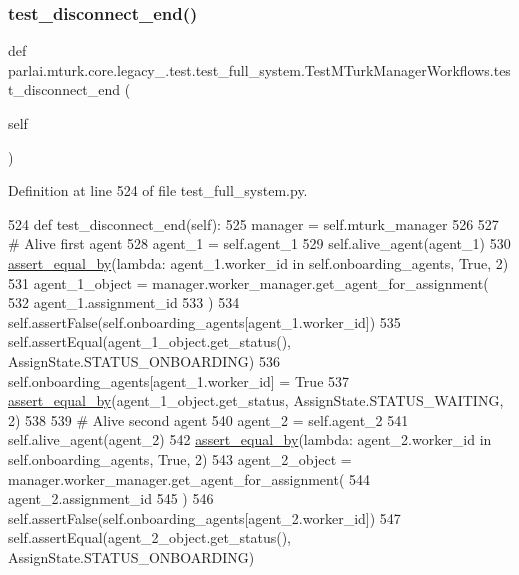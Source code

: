 \subsubsection{\texorpdfstring{test\+\_\+disconnect\+\_\+end()}{test\_disconnect\_end()}}
{\footnotesize\ttfamily def parlai.\+mturk.\+core.\+legacy\+\_.\+test.\+test\+\_\+full\+\_\+system.\+Test\+M\+Turk\+Manager\+Workflows.\+test\+\_\+disconnect\+\_\+end (\begin{DoxyParamCaption}\item[{}]{self }\end{DoxyParamCaption})}



Definition at line 524 of file test\+\_\+full\+\_\+system.\+py.


\begin{DoxyCode}
524     \textcolor{keyword}{def }test\_disconnect\_end(self):
525         manager = self.mturk\_manager
526 
527         \textcolor{comment}{# Alive first agent}
528         agent\_1 = self.agent\_1
529         self.alive\_agent(agent\_1)
530         \hyperlink{namespaceparlai_1_1mturk_1_1core_1_1test_1_1test__full__system_a0b463246d35658a2e422010f13dcf819}{assert\_equal\_by}(\textcolor{keyword}{lambda}: agent\_1.worker\_id \textcolor{keywordflow}{in} self.onboarding\_agents, \textcolor{keyword}{True}, 2)
531         agent\_1\_object = manager.worker\_manager.get\_agent\_for\_assignment(
532             agent\_1.assignment\_id
533         )
534         self.assertFalse(self.onboarding\_agents[agent\_1.worker\_id])
535         self.assertEqual(agent\_1\_object.get\_status(), AssignState.STATUS\_ONBOARDING)
536         self.onboarding\_agents[agent\_1.worker\_id] = \textcolor{keyword}{True}
537         \hyperlink{namespaceparlai_1_1mturk_1_1core_1_1test_1_1test__full__system_a0b463246d35658a2e422010f13dcf819}{assert\_equal\_by}(agent\_1\_object.get\_status, AssignState.STATUS\_WAITING, 2)
538 
539         \textcolor{comment}{# Alive second agent}
540         agent\_2 = self.agent\_2
541         self.alive\_agent(agent\_2)
542         \hyperlink{namespaceparlai_1_1mturk_1_1core_1_1test_1_1test__full__system_a0b463246d35658a2e422010f13dcf819}{assert\_equal\_by}(\textcolor{keyword}{lambda}: agent\_2.worker\_id \textcolor{keywordflow}{in} self.onboarding\_agents, \textcolor{keyword}{True}, 2)
543         agent\_2\_object = manager.worker\_manager.get\_agent\_for\_assignment(
544             agent\_2.assignment\_id
545         )
546         self.assertFalse(self.onboarding\_agents[agent\_2.worker\_id])
547         self.assertEqual(agent\_2\_object.get\_status(), AssignState.STATUS\_ONBOARDING)

\end{DoxyCode}
